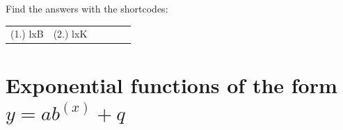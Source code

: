 \par {} Find the answers with the shortcodes:
\par \begin{tabular}[h]{cccccc}
(1.) lxB  &  (2.) lxK  & \end{tabular}
% 
%     
%     
%     
%     
%     
%     

\section{Exponential functions of the form $y=a{b}^{(x)}+q$}
\nopagebreak
